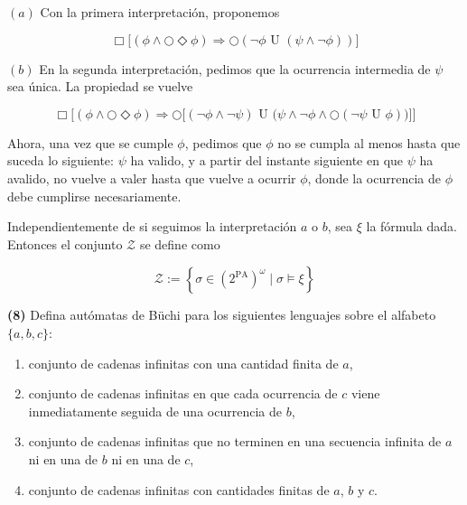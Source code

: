 \documentclass[a4paper, 12pt]{article}
\begin{document}
$(a)$ Con la primera interpretación, proponemos 

\begin{equation*}
    \Box \Big[ 
    (\phi \land \bigcirc \Diamond \phi) \Rightarrow \bigcirc  \left( \neg \phi \text{ U }
    ( \psi \land \neg \phi ) \right) 
    \Big]
\end{equation*}

$(b)$ En la segunda interpretación, pedimos que la ocurrencia intermedia de
$\psi$ sea única. La propiedad se vuelve


\begin{equation*}
\Box \Big[ (\phi \land \bigcirc \Diamond \phi) \Rightarrow \bigcirc \big[ (\neg \phi \land \neg \psi) \text{ U } \big( \psi \land \neg \phi \land \bigcirc (\neg \psi \text{ U } \phi) \big) \big] \Big]
\end{equation*}

Ahora, una vez que se cumple $\phi$, pedimos que $\phi$ no se cumpla al menos
hasta que suceda lo siguiente: $\psi$ ha valido, y a partir del instante
siguiente en que $\psi$ ha avalido, no vuelve a valer hasta que vuelve a ocurrir
$\phi$, donde la ocurrencia de $\phi$ debe cumplirse necesariamente.

Independientemente de si seguimos la interpretación $a$ o $b$, sea $\xi$ la
fórmula dada. Entonces el conjunto $\mathcal{Z}$ se define como

\begin{equation*}
    \mathcal{Z} := \left\{ \sigma \in ( 2^{\text{PA}} )^\omega \mid \sigma
    \vDash \xi \right\} 
\end{equation*}


\pagebreak 

\begin{myframe}
    \textbf{(8)} Defina autómatas de Büchi para los siguientes lenguajes sobre el alfabeto $\{a, b, c\}$:

\begin{enumerate}
    \item conjunto de cadenas infinitas con una cantidad finita de $a$,
    \item conjunto de cadenas infinitas en que cada ocurrencia de $c$ viene inmediatamente seguida de una ocurrencia de $b$,
    \item conjunto de cadenas infinitas que no terminen en una secuencia infinita de $a$ ni en una de $b$ ni en una de $c$,
    \item conjunto de cadenas infinitas con cantidades finitas de $a$, $b$ y $c$.
\end{enumerate}
\end{myframe}
\end{document}
